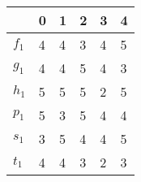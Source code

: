 \documentclass[a4paper, 14pt]{extarticle}
\begin{document}
\begin{center} 
\begin{tabular}{| l | l | l | l | l | l |}
\hline
 & 0 & 1 & 2 & 3 & 4 \\
\hline
$f_{1}$ & 4 & 4 & 3 & 4 & 5 \\
\hline
$g_{1}$ & 4 & 4 & 5 & 4 & 3 \\
\hline
$h_{1}$ & 5 & 5 & 5 & 2 & 5 \\
\hline
$p_{1}$ & 5 & 3 & 5 & 4 & 4 \\
\hline
$s_{1}$ & 3 & 5 & 4 & 4 & 5 \\
\hline
$t_{1}$ & 4 & 4 & 3 & 2 & 3 \\
\hline
\end{tabular}
\end{center}
\end{document}
